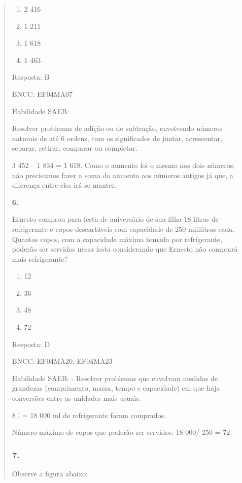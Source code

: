 \begin{enumerate}
\begin{escolha}
\begin{enumerate}
\begin{itemize}
\begin{itemize}
\begin{escolha}
\begin{quote}
\begin{escolha}
{\begin{enumerate}
\def\labelenumi{\alph{enumi})}
\item
  2 416
\item
  1 211
\item
  1 618
\item
  1 463
\end{enumerate}

Resposta: B

BNCC: EF04MA07

Habilidade SAEB:

Resolver problemas de adição ou de subtração, envolvendo números
naturais de até 6 ordens, com os significados de juntar, acrescentar,
separar, retirar, comparar ou completar.

3 452 -- 1 834 = 1 618. Como o aumento foi o mesmo nos dois números, não
precisamos fazer a soma do aumento aos números antigos já que, a
diferença entre eles irá se manter.

\textbf{6.}

Ernesto comprou para festa de aniversário de sua filha 18 litros de
refrigerante e copos descartáveis com capacidade de 250 mililitros cada.
Quantos copos, com a capacidade máxima tomada por refrigerante, poderão
ser servidos nessa festa considerando que Ernesto não comprará mais
refrigerante?

\begin{enumerate}
\def\labelenumi{\alph{enumi})}
\item
  12
\item
  36
\item
  48
\item
  72
\end{enumerate}

Resposta: D

BNCC: EF04MA20, EF04MA23

Habilidade SAEB: - Resolver problemas que envolvam medidas de grandezas
(comprimento, massa, tempo e capacidade) em que haja conversões entre as
unidades mais usuais.

8 l = 18 000 ml de refrigerante foram comprados.

Número máximo de copos que poderão ser servidos: 18 000/ 250 = 72.

\subsubsection{7.}\label{section-148}

Observe a figura abaixo:

}
\end{escolha}
\end{quote}
\end{escolha}
\end{itemize}
\end{itemize}
\end{enumerate}
\end{escolha}
\end{enumerate}
